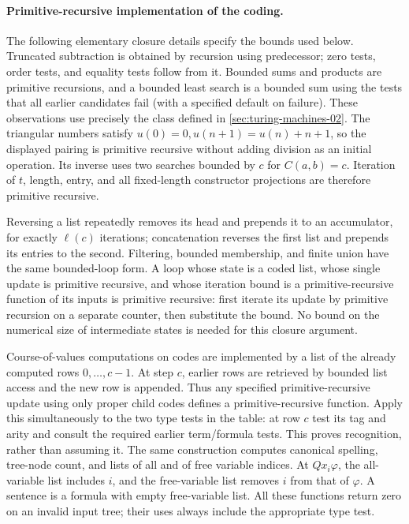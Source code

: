 \paragraph{Primitive-recursive implementation of the coding.}
The following elementary closure details specify the bounds used below.
Truncated subtraction is obtained by recursion using predecessor; zero tests,
order tests, and equality tests follow from it.  Bounded sums and products
are primitive recursions, and a bounded least search is a bounded sum using
the tests that all earlier candidates fail (with a specified default on
failure).  These observations use precisely the class defined in
\cref{sec:turing-machines-02}.  The triangular numbers satisfy
\(u(0)=0, u(n+1)=u(n)+n+1\), so the displayed pairing is primitive
recursive without adding division as an initial operation.  Its inverse
uses two searches bounded by \(c\) for \(C(a,b)=c\).  Iteration of
\(t\), length, entry, and all fixed-length constructor projections are
therefore primitive recursive.

Reversing a list repeatedly removes its head and prepends it to an
accumulator, for exactly \(\ell(c)\) iterations; concatenation reverses
the first list and prepends its entries to the second.  Filtering, bounded
membership, and finite union have the same bounded-loop form.  A loop whose
state is a coded list, whose single update is primitive recursive, and
whose iteration bound is a primitive-recursive function of its inputs is
primitive recursive: first iterate its update by primitive recursion on a
separate counter, then substitute the bound.  No bound on the numerical
size of intermediate states is needed for this closure argument.

Course-of-values computations on codes are implemented by a list of the
already computed rows \(0,\ldots,c-1\).  At step \(c\), earlier rows are
retrieved by bounded list access and the new row is appended.  Thus any
specified primitive-recursive update using only proper child codes defines
a primitive-recursive function.  Apply this simultaneously to the two type
tests in the table: at row \(c\) test its tag and arity and consult the
required earlier term/formula tests.  This proves recognition, rather than
assuming it.  The same construction computes canonical spelling, tree-node
count, and lists of all and of free variable indices.  At \(Qx_i\varphi\),
the all-variable list includes \(i\), and the free-variable list removes
\(i\) from that of \(\varphi\).  A sentence is a formula with empty
free-variable list.  All these functions return zero on an invalid input
tree; their uses always include the appropriate type test.

